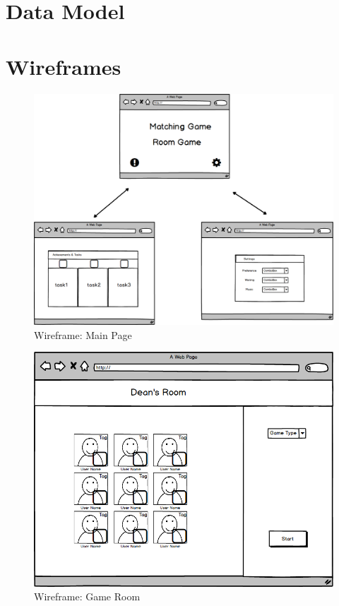\documentclass[11pt]{article}
\begin{document}
\section{Data Model}

\section{Wireframes}

\begin{figure}
\centering
\includegraphics[width=0.7\linewidth, keepaspectratio]{wf-mainpage.png}
\caption{Wireframe: Main Page}
\label{fig:main}
\end{figure}

\begin{figure}
\centering
\includegraphics[width=0.7\linewidth, keepaspectratio]{wf-inroom.png}
\caption{Wireframe: Game Room}
\label{fig:room}
\end{figure}
\end{document}
